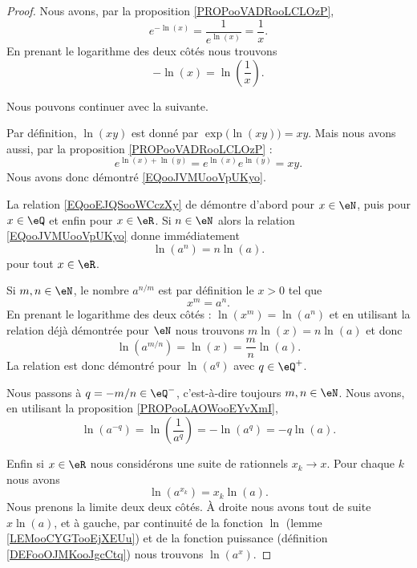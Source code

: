 \begin{proof}
    Nous avons, par la proposition \ref{PROPooVADRooLCLOzP},
    \begin{equation}
        e^{-\ln(x)}=\frac{1}{  e^{\ln(x)} }=\frac{1}{ x }.
    \end{equation}
    En prenant le logarithme des deux côtés nous trouvons
    \begin{equation}
        -\ln(x)=\ln\left( \frac{1}{ x } \right).
    \end{equation}

    Nous pouvons continuer avec la suivante.

    Par définition, \( \ln(xy)\) est donné par \( \exp\big( \ln(xy) \big)=xy\). Mais nous avons aussi, par la proposition \ref{PROPooVADRooLCLOzP} :
    \begin{equation}
        e^{\ln(x)+\ln(y)}=e^{\ln(x)}e^{\ln(y)}=xy.
    \end{equation}
    Nous avons donc démontré \eqref{EQooJVMUooVpUKyo}.

    La relation \eqref{EQooEJQSooWCczXy} de démontre d'abord pour \( x\in \eN\), puis pour \( x\in \eQ\) et enfin pour \( x\in\eR\). Si \( n\in \eN\) alors la relation \eqref{EQooJVMUooVpUKyo} donne immédiatement
    \begin{equation}
        \ln(a^n)=n\ln(a).
    \end{equation}
    pour tout \( x\in \eR\).

    Si \( m,n\in \eN\), le nombre \( a^{n/m}\) est par définition le \( x>0\) tel que
    \begin{equation}
        x^m=a^n.
    \end{equation}
    En prenant le logarithme des deux côtés : \( \ln(x^m)=\ln(a^n)\) et en utilisant la relation déjà démontrée pour \( \eN\) nous trouvons \( m\ln(x)=n\ln(a)\) et donc
    \begin{equation}
        \ln(a^{m/n})=\ln(x)=\frac{ m }{ n }\ln(a).
    \end{equation}
    La relation est donc démontré pour \( \ln(a^q)\) avec \( q\in \eQ^+\).

    Nous passons à \( q=-m/n\in \eQ^-\), c'est-à-dire toujours \( m,n\in \eN\). Nous avons, en utilisant la proposition \ref{PROPooLAOWooEYvXmI},
    \begin{equation}
        \ln(a^{-q})=\ln(\frac{1}{ a^q })=-\ln(a^q)=-q\ln(a).
    \end{equation}

    Enfin si \( x\in \eR\) nous considérons une suite de rationnels \( x_k\to x\). Pour chaque \( k\) nous avons
    \begin{equation}
        \ln(a^{x_k})=x_k\ln(a).
    \end{equation}
    Nous prenons la limite deux deux côtés. À droite nous avons tout de suite \( x\ln(a)\), et à gauche, par continuité de la fonction \( \ln\) (lemme \ref{LEMooCYGTooEjXEUu}) et de la fonction puissance (définition \ref{DEFooOJMKooJgcCtq}) nous trouvons \( \ln(a^x)\).
\end{proof}

